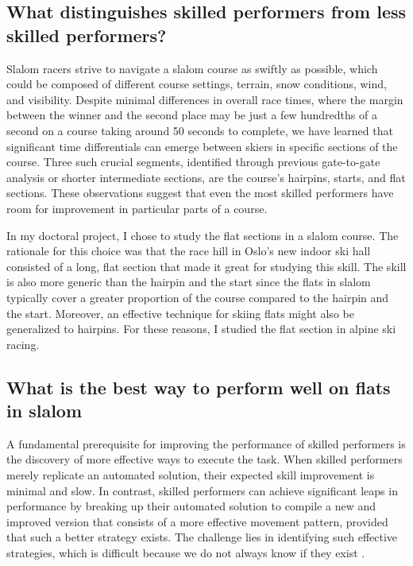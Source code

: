 
\subsection{What distinguishes skilled performers from less skilled performers?}
Slalom racers strive to navigate a slalom course as swiftly as possible, which could be composed of different course settings, terrain, snow conditions, wind, and visibility. Despite minimal differences in overall race times, where the margin between the winner and the second place may be just a few hundredths of a second on a course taking around 50 seconds to complete, we have learned that significant time differentials can emerge between skiers in specific sections of the course\cite{reid_kinematic_2010, supej_relations_2006, supej_differential_2008, federolf_quantifying_2012, supej_new_2011}. Three such crucial segments, identified through previous gate-to-gate analysis or shorter intermediate sections, are the course's hairpins, starts, and flat sections\cite{supej_new_2011}. These observations suggest that even the most skilled performers have room for improvement in particular parts of a course.

In my doctoral project, I chose to study the flat sections in a slalom course. The rationale for this choice was that the race hill in Oslo's new indoor ski hall consisted of a long, flat section that made it great for studying this skill. The skill is also more generic than the hairpin and the start since the flats in slalom typically cover a greater proportion of the course compared to the hairpin and the start. Moreover, an effective technique for skiing flats might also be generalized to hairpins. For these reasons, I studied the flat section in alpine ski racing. 


\subsection{What is the best way to perform well on flats in slalom}
A fundamental prerequisite for improving the performance of skilled performers is the discovery of more effective ways to execute the task. When skilled performers merely replicate an automated solution, their expected skill improvement is minimal and slow. In contrast, skilled performers can achieve significant leaps in performance by breaking up their automated solution to compile a new and improved version that consists of a more effective movement pattern, provided that such a better strategy exists. The challenge lies in identifying such effective strategies, which is difficult because we do not always know if they exist \cite{gray_plateaus_2017}.

